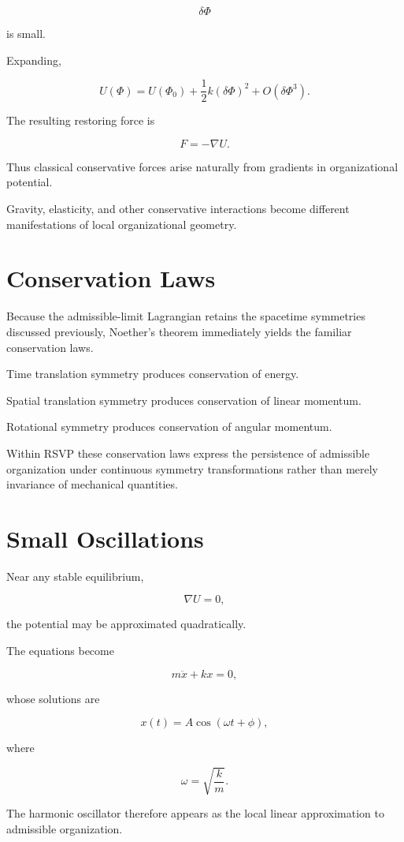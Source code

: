 \documentclass[11pt,oneside]{book}
\numberwithin{equation}{chapter}
\theoremstyle{definition}
\theoremstyle{plain}
\begin{document}
\[
\delta\Phi
\]

is small.

Expanding,

\[
U(\Phi)
=
U(\Phi_0)
+
\frac12
k
(\delta\Phi)^2
+
O(\delta\Phi^3).
\]

The resulting restoring force is

\[
F
=
-
\nabla U.
\]

Thus classical conservative forces arise naturally from gradients in
organizational potential.

Gravity, elasticity, and other conservative interactions become different
manifestations of local organizational geometry.

\section{Conservation Laws}

Because the admissible-limit Lagrangian retains the spacetime symmetries
discussed previously, Noether's theorem immediately yields the familiar
conservation laws.

Time translation symmetry produces conservation of energy.

Spatial translation symmetry produces conservation of linear momentum.

Rotational symmetry produces conservation of angular momentum.

Within RSVP these conservation laws express the persistence of admissible
organization under continuous symmetry transformations rather than merely
invariance of mechanical quantities.

\section{Small Oscillations}

Near any stable equilibrium,

\[
\nabla U=0,
\]

the potential may be approximated quadratically.

The equations become

\[
m
\ddot x
+
kx
=
0,
\]

whose solutions are

\[
x(t)
=
A\cos(\omega t+\phi),
\]

where

\[
\omega
=
\sqrt{\frac{k}{m}}.
\]

The harmonic oscillator therefore appears as the local linear approximation
to admissible organization.
\end{document}
